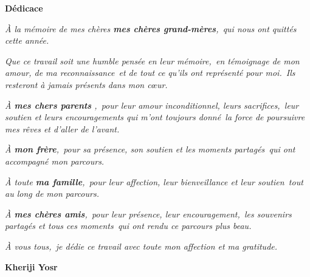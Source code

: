 \begin{center}
\textbf{\Huge Dédicace}
\end{center}

\vspace{1.5cm}

\begin{center}
\textit{
À la mémoire de mes chères \textbf{mes chères grand-mères},\
qui nous ont quittés cette année.\
}
\end{center}

\vspace{0.5cm}

\begin{center}
\textit{
Que ce travail soit une humble pensée en leur mémoire,\
en témoignage de mon amour, de ma reconnaissance\
et de tout ce qu’ils ont représenté pour moi.\
Ils resteront à jamais présents dans mon cœur.
}
\end{center}

\vspace{0.8cm}

\begin{center}
\textit{
À \textbf{mes chers parents} ,\
pour leur amour inconditionnel, leurs sacrifices,\
leur soutien et leurs encouragements qui m’ont toujours donné\
la force de poursuivre mes rêves et d’aller de l’avant.
}
\end{center}

\vspace{0.8cm}

\begin{center}
\textit{
À \textbf{mon frère},\
pour sa présence, son soutien et les moments partagés\
qui ont accompagné mon parcours.
}
\end{center}

\vspace{0.8cm}

\begin{center}
\textit{
À toute \textbf{ma famille},\
pour leur affection, leur bienveillance et leur soutien\
tout au long de mon parcours.
}
\end{center}

\vspace{0.8cm}

\begin{center}
\textit{
À \textbf{mes chères amis},\
pour leur présence, leur encouragement,\
les souvenirs partagés et tous ces moments\
qui ont rendu ce parcours plus beau.
}
\end{center}

\vspace{0.8cm}

\begin{center}
\textit{
À vous tous,\
je dédie ce travail avec toute mon affection et ma gratitude.
}
\end{center}
\begin{center}
\raggedleft\textbf{Kheriji Yosr}
\end{center}
\thispagestyle{plain}
